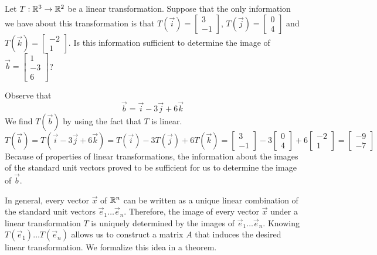 \documentclass{ximera}
\begin{document}
\begin{example}\label{ex:imageofatransformation}  
Let $T:\mathbb{R}^3\rightarrow \mathbb{R}^2$ be a linear transformation. Suppose that the only information we have about this transformation is that $T(\vec{i})=\begin{bmatrix}3\\-1\end{bmatrix}$, $T(\vec{j})=\begin{bmatrix}0\\4\end{bmatrix}$ and $T(\vec{k})=\begin{bmatrix}-2\\1\end{bmatrix}$.  Is this information sufficient to determine the image of $\vec{b}=\begin{bmatrix}1\\-3\\6\end{bmatrix}$?

\begin{explanation}  Observe that 
$$\vec{b}=\vec{i}-3\vec{j}+6\vec{k}$$
We find $T(\vec{b})$ by using the fact that $T$ is linear.
$$T(\vec{b})=T(\vec{i}-3\vec{j}+6\vec{k})=T(\vec{i})-3T(\vec{j})+6T(\vec{k})=\begin{bmatrix}3\\-1\end{bmatrix}-3\begin{bmatrix}0\\4\end{bmatrix}+6\begin{bmatrix}-2\\1\end{bmatrix}=\begin{bmatrix}-9\\-7\end{bmatrix}$$
Because of properties of linear transformations, the information about the images of the standard unit vectors proved to be sufficient for us to determine the image of $\vec{b}$. 
\end{explanation}
\end{example}

In general, every vector $\vec{x}$ of $\mathbb{R}^n$ can be written as a unique linear combination of the standard unit vectors $\vec{e}_1\ldots \vec{e}_n$.  Therefore, the image of every vector $\vec{x}$ under a linear transformation $T$ is uniquely determined by the images of $\vec{e}_1\ldots \vec{e}_n$.  Knowing $T(\vec{e}_1)\ldots T(\vec{e}_n)$ allows us to construct a matrix $A$ that induces the desired linear transformation.  We formalize this idea in a theorem.
\end{document}
